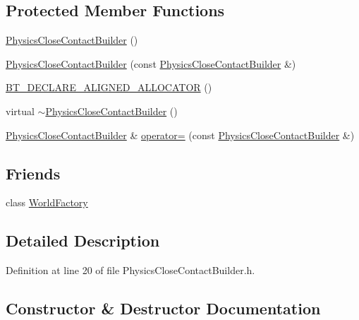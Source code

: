 \subsection*{Protected Member Functions}
\begin{DoxyCompactItemize}
\item 
\mbox{\hyperlink{classnjli_1_1_physics_close_contact_builder_a8a48cc12d8fb8bb524b33a43c087639d}{Physics\+Close\+Contact\+Builder}} ()
\item 
\mbox{\hyperlink{classnjli_1_1_physics_close_contact_builder_a5edb032228c085e5977c6617a4500737}{Physics\+Close\+Contact\+Builder}} (const \mbox{\hyperlink{classnjli_1_1_physics_close_contact_builder}{Physics\+Close\+Contact\+Builder}} \&)
\item 
\mbox{\hyperlink{classnjli_1_1_physics_close_contact_builder_a7210fc81b1aaa792fe84a01377b05d1c}{B\+T\+\_\+\+D\+E\+C\+L\+A\+R\+E\+\_\+\+A\+L\+I\+G\+N\+E\+D\+\_\+\+A\+L\+L\+O\+C\+A\+T\+OR}} ()
\item 
virtual \mbox{\hyperlink{classnjli_1_1_physics_close_contact_builder_a2fb47a3eaee6cb4c43e3f296ec9c1f34}{$\sim$\+Physics\+Close\+Contact\+Builder}} ()
\item 
\mbox{\hyperlink{classnjli_1_1_physics_close_contact_builder}{Physics\+Close\+Contact\+Builder}} \& \mbox{\hyperlink{classnjli_1_1_physics_close_contact_builder_a6608b0fc3b34ad18eb5cc3c50e177e22}{operator=}} (const \mbox{\hyperlink{classnjli_1_1_physics_close_contact_builder}{Physics\+Close\+Contact\+Builder}} \&)
\end{DoxyCompactItemize}
\subsection*{Friends}
\begin{DoxyCompactItemize}
\item 
class \mbox{\hyperlink{classnjli_1_1_physics_close_contact_builder_acb96ebb09abe8f2a37a915a842babfac}{World\+Factory}}
\end{DoxyCompactItemize}


\subsection{Detailed Description}


Definition at line 20 of file Physics\+Close\+Contact\+Builder.\+h.



\subsection{Constructor \& Destructor Documentation}
\mbox{\label{classnjli_1_1_physics_close_contact_builder_a8a48cc12d8fb8bb524b33a43c087639d}} 
